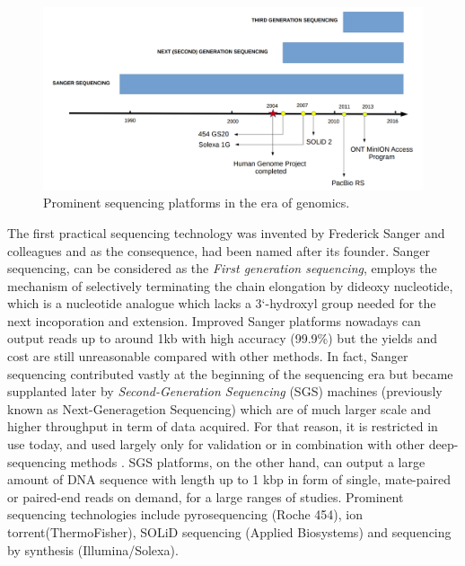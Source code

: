 \begin{figure}[ht!]
\centering
\includegraphics[width=.9\textwidth]{images/timeline.png}
\caption{Prominent sequencing platforms in the era of genomics.}
\label{Fig:nanopore}
\end{figure}
The first practical sequencing technology was invented by Frederick Sanger and colleagues \cite{Sanger1977} and as the consequence, had been named after its founder. 
Sanger sequencing, can be considered as the \emph{First generation sequencing}, employs the mechanism of selectively terminating the chain elongation by dideoxy nucleotide, which is a nucleotide analogue which lacks a 3`-hydroxyl group needed for the next incoporation and extension.
Improved Sanger platforms nowadays can output reads up to around 1kb with high accuracy (99.9\%) but the yields and cost are still unreasonable compared with other methods.
In fact, Sanger sequencing contributed vastly at the beginning of the sequencing era but became supplanted later by \emph{Second-Generation Sequencing} (SGS) machines (previously known as Next-Generagetion Sequencing) which are of much larger scale and higher throughput in term of data acquired. For that reason, it is restricted in use today, and used largely only for validation or in combination with other deep-sequencing methods \cite{Freeman2009}.
SGS platforms, on the other hand, can output a large amount of DNA sequence with length up to 1 kbp in form of single, mate-paired or paired-end reads on demand, for a large ranges of studies.
Prominent sequencing technologies include pyrosequencing \cite{Ronaghi1996,Ronaghi1998} 
(Roche 454), ion torrent(ThermoFisher), SOLiD sequencing (Applied Biosystems) and sequencing by synthesis (Illumina/Solexa).

